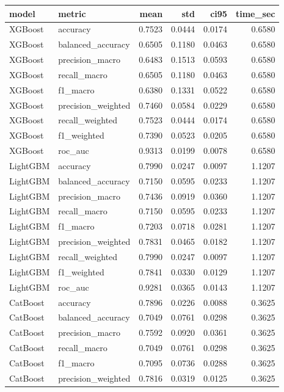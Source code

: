 \begin{tabular}{llrrrr}
\toprule
model & metric & mean & std & ci95 & time_sec \\
\midrule
XGBoost & accuracy & 0.7523 & 0.0444 & 0.0174 & 0.6580 \\
XGBoost & balanced_accuracy & 0.6505 & 0.1180 & 0.0463 & 0.6580 \\
XGBoost & precision_macro & 0.6483 & 0.1513 & 0.0593 & 0.6580 \\
XGBoost & recall_macro & 0.6505 & 0.1180 & 0.0463 & 0.6580 \\
XGBoost & f1_macro & 0.6380 & 0.1331 & 0.0522 & 0.6580 \\
XGBoost & precision_weighted & 0.7460 & 0.0584 & 0.0229 & 0.6580 \\
XGBoost & recall_weighted & 0.7523 & 0.0444 & 0.0174 & 0.6580 \\
XGBoost & f1_weighted & 0.7390 & 0.0523 & 0.0205 & 0.6580 \\
XGBoost & roc_auc & 0.9313 & 0.0199 & 0.0078 & 0.6580 \\
LightGBM & accuracy & 0.7990 & 0.0247 & 0.0097 & 1.1207 \\
LightGBM & balanced_accuracy & 0.7150 & 0.0595 & 0.0233 & 1.1207 \\
LightGBM & precision_macro & 0.7436 & 0.0919 & 0.0360 & 1.1207 \\
LightGBM & recall_macro & 0.7150 & 0.0595 & 0.0233 & 1.1207 \\
LightGBM & f1_macro & 0.7203 & 0.0718 & 0.0281 & 1.1207 \\
LightGBM & precision_weighted & 0.7831 & 0.0465 & 0.0182 & 1.1207 \\
LightGBM & recall_weighted & 0.7990 & 0.0247 & 0.0097 & 1.1207 \\
LightGBM & f1_weighted & 0.7841 & 0.0330 & 0.0129 & 1.1207 \\
LightGBM & roc_auc & 0.9281 & 0.0365 & 0.0143 & 1.1207 \\
CatBoost & accuracy & 0.7896 & 0.0226 & 0.0088 & 0.3625 \\
CatBoost & balanced_accuracy & 0.7049 & 0.0761 & 0.0298 & 0.3625 \\
CatBoost & precision_macro & 0.7592 & 0.0920 & 0.0361 & 0.3625 \\
CatBoost & recall_macro & 0.7049 & 0.0761 & 0.0298 & 0.3625 \\
CatBoost & f1_macro & 0.7095 & 0.0736 & 0.0288 & 0.3625 \\
CatBoost & precision_weighted & 0.7816 & 0.0319 & 0.0125 & 0.3625 \\

\end{tabular}
